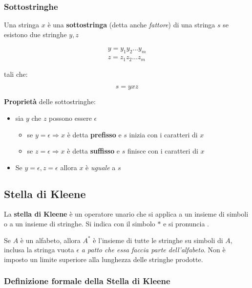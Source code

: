 \documentclass[italian, 10pt]{article}
\begin{document}
\subsubsection{Sottostringhe}

Una stringa \(x\) è una \textbf{sottostringa} (detta anche \textit{fattore}) di una stringa \(s\) se esistono due stringhe \(y, z\)

\begin{gather*}
  y = y_1 y_2 \ldots y_m \\
  z = z_1 z_2 \ldots z_m
\end{gather*}

tali che:

\[ s = y x z \]

\bigskip
\textbf{Proprietà} delle sottostringhe:

\begin{itemize}
  \item sia \(y\) che \(z\) possono essere \(\epsilon\)
        \begin{itemize}
          \item se \(y = \epsilon \Rightarrow x\) è detta \textbf{prefisso} e \(s\) inizia con i caratteri di \(x\)
          \item se \(z = \epsilon \Rightarrow x\) è detta \textbf{suffisso} e \(s\) finisce con i caratteri di \(x\)
        \end{itemize}
  \item Se \(y = \epsilon, z = \epsilon\) allora \(x\) è \textit{uguale} a \(s\)
\end{itemize}

\subsection{Stella di Kleene}
\label{sec:stella-di-Kleene}

La \textbf{stella di Kleene} è un operatore unario che si applica a un insieme di simboli o a un insieme di stringhe.
Si indica con il simbolo \(\ast\) e si pronuncia .

Se \(A\) è un alfabeto, allora \(A^\ast\) è l'insieme di tutte le stringhe su simboli di \(A\), inclusa la stringa vuota \(\epsilon\) \textit{a patto che essa faccia parte dell'alfabeto}.
Non è imposto un limite superiore alla lunghezza delle stringhe prodotte.

\subsubsection{Definizione formale della Stella di Kleene}
\end{document}
